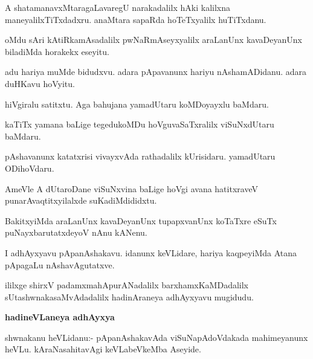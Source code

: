 \begin{mng}
A shatamanavxMtaragaLavaregU narakadalilx hAki kalilxna maneyalilxTiTxdadxru. anaMtara sapaRda hoTeTxyalilx huTiTxdanu.
\end{mng}

\begin{mng}
oMdu sAri kAtiRkamAsadalilx pwNaRmAseyxyalilx araLanUnx kavaDeyanUnx biladiMda horakekx eseyitu.
\end{mng}

\begin{mng}
adu hariya muMde bidudxvu. adara pApavanunx hariyu nAshamADidanu. adara duHKavu hoVyitu.
\end{mng}

\begin{mng}
hiVgiralu satitxtu. Aga bahujana yamadUtaru koMDoyayxlu baMdaru.
\end{mng}

\begin{mng}
kaTiTx yamana baLige tegedukoMDu hoVguvaSaTxralilx viSuNxdUtaru baMdaru.
\end{mng}

\begin{mng}
pAshavanunx katatxrisi vivayxvAda rathadalilx kUrisidaru. yamadUtaru ODihoVdaru.
\end{mng}

\begin{mng}
AmeVle A dUtaroDane viSuNxvina baLige hoVgi avana hatitxraveV punarAvaqtitxyilalxde suKadiMdididxtu.
\end{mng}

\begin{mng}
BakitxyiMda araLanUnx kavaDeyanUnx tupapxvanUnx koTaTxre eSuTx puNayxbarutatxdeyoV nAnu kANenu.
\end{mng}

\begin{mng}
I adhAyxyavu pApanAshakavu. idanunx keVLidare, hariya kaqpeyiMda Atana pApagaLu nAshavAgutatxve.
\end{mng}
ililxge shirxV padamxmahApurANadalilx barxhamxKaMDadalilx sUtashwnakasaMvAdadalilx hadinAraneya adhAyxyavu mugidudu.

\begin{center}
\textbf{hadineVLaneya adhAyxya}
\end{center}

\begin{mng}
shwnakanu heVLidanu:- pApanAshakavAda viSuNapAdoVdakada mahimeyanunx heVLu. kAraNasahitavAgi keVLabeVkeMba Aseyide.
\end{mng}

